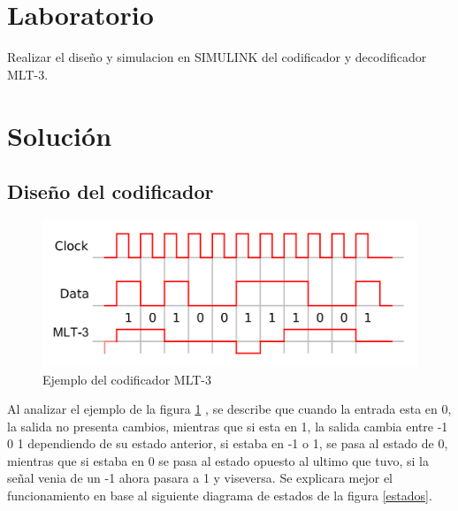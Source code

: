 \maketitle

\section{Laboratorio}

Realizar el diseño y simulacion en SIMULINK del codificador y decodificador MLT-3.

\section{Solución}
\subsection{Diseño del codificador}

\begin{figure}[H]
    \centering
    \includegraphics[width=1\textwidth]{laboratorioMLT3/imagenes/MLT3encoding.png}
    \caption{\label{ejemplo}Ejemplo del codificador MLT-3}
\end{figure}

Al analizar el ejemplo de la figura \ref{ejemplo} , se describe que cuando la entrada esta en 0, la salida no presenta cambios, mientras que si esta en 1, la salida cambia entre -1 0 1 dependiendo de su estado anterior, si estaba en -1 o 1, se pasa al estado de 0, mientras que si estaba en 0 se pasa al estado opuesto al ultimo que tuvo, si la señal venia de un -1 ahora pasara a 1 y viseversa. Se explicara mejor el funcionamiento en base al siguiente diagrama de estados de la figura \ref{estados}.

